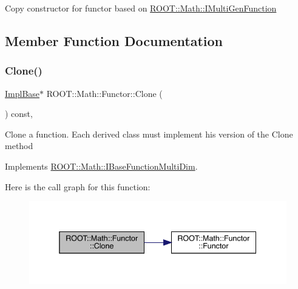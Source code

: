 Copy constructor for functor based on \mbox{\hyperlink{namespaceROOT_1_1Math_aec22897f3d759f7c284893c81d980799}{R\+O\+O\+T\+::\+Math\+::\+I\+Multi\+Gen\+Function}} 

\subsection{Member Function Documentation}
\mbox{\label{classROOT_1_1Math_1_1Functor_a989f9b6dd160ebe03911cdee00dacaad}} 
\subsubsection{\texorpdfstring{Clone()}{Clone()}\hspace{0.1cm}{\footnotesize\ttfamily [1/2]}}
{\footnotesize\ttfamily \mbox{\hyperlink{classROOT_1_1Math_1_1Functor_acc5dacb213f26296122e95138f5153b3}{Impl\+Base}}$\ast$ R\+O\+O\+T\+::\+Math\+::\+Functor\+::\+Clone (\begin{DoxyParamCaption}{ }\end{DoxyParamCaption}) const\hspace{0.3cm}{\ttfamily [inline]}, {\ttfamily [virtual]}}

Clone a function. Each derived class must implement his version of the Clone method 

Implements \mbox{\hyperlink{classROOT_1_1Math_1_1IBaseFunctionMultiDim_a57939204b1f525b43835b42e0635dd3b}{R\+O\+O\+T\+::\+Math\+::\+I\+Base\+Function\+Multi\+Dim}}.

Here is the call graph for this function\+:
\nopagebreak
\begin{figure}[H]
\begin{center}
\leavevmode
\includegraphics[width=338pt]{da/d8e/classROOT_1_1Math_1_1Functor_a989f9b6dd160ebe03911cdee00dacaad_cgraph}
\end{center}
\end{figure}
\mbox{\label{classROOT_1_1Math_1_1Functor_a989f9b6dd160ebe03911cdee00dacaad}} 
